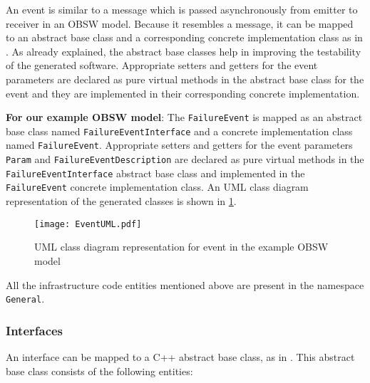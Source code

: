 An event is similar to a message which is passed asynchronously from emitter to receiver \cite{SpecMetamodel} in an OBSW model. Because it resembles a message, it can be mapped to an abstract base class and a corresponding concrete implementation class as in \cite{EvoRAVCodeAr}. As already explained, the abstract base classes help in improving the testability of the generated software. Appropriate setters and getters for the event parameters are declared as pure virtual methods in the abstract base class for the event and they are implemented in their corresponding concrete implementation.

\textbf{For our example OBSW model}: The \texttt{FailureEvent} is mapped as an abstract base class named \texttt{FailureEvent\allowbreak Interface} and a concrete implementation class named \texttt{FailureEvent}. Appropriate setters and getters for the event parameters \texttt{Param} and \texttt{Failure\allowbreak Event\allowbreak	Description} are declared as pure virtual methods in the \texttt{FailureEvent\allowbreak Interface} abstract base class and implemented in the \texttt{FailureEvent} concrete implementation class. An UML class diagram representation of the generated classes is shown in \cref{fig: EventUML}.

\begin{figure}[h]
	\centering
	\texttt{[image: EventUML.pdf]}
	\caption{UML class diagram representation for event in the example OBSW model}
	\label{fig: EventUML}
\end{figure}    

All the infrastructure code entities mentioned above are present in the namespace \texttt{General}.  

\subsubsection{\textbf{Interfaces}}
An interface can be mapped to a C++ abstract base class, as in \cite{EvoRAVCodeAr}. This abstract base class consists of the following entities:

